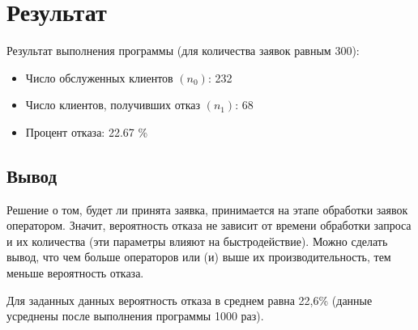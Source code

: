\chapter{Результат}

\noindent Результат выполнения программы (для количества заявок равным 300):
\begin{itemize}
	\item Число обслуженных клиентов $(n_0)$: 232
	\item Число клиентов, получивших отказ $(n_1)$: 68
	\item Процент отказа: 22.67 \%
\end{itemize}

\section{Вывод}

Решение о том, будет ли принята заявка, принимается на этапе обработки заявок оператором. Значит, вероятность отказа не зависит от времени обработки запроса и их количества (эти параметры влияют на быстродействие). Можно сделать вывод, что чем больше операторов или (и) выше их производительность, тем меньше вероятность отказа.

Для заданных данных вероятность отказа в среднем равна 22,6\% (данные усреднены после выполнения программы 1000 раз).
